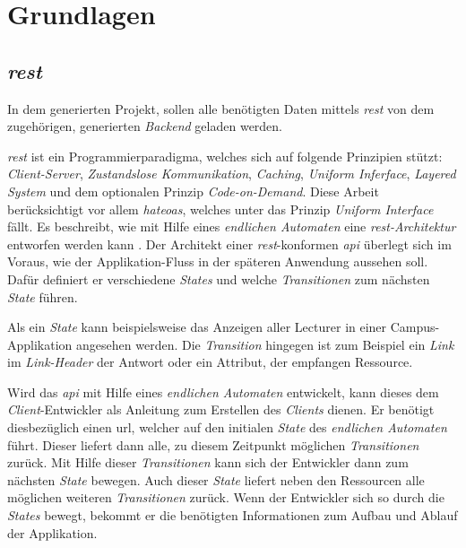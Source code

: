 \chapter{Grundlagen}\label{ch:basics}
\section{\textit{\acf{rest}}}\label{sec:rest}
In dem generierten Projekt, sollen alle benötigten Daten mittels \textit{\ac{rest}} von dem zugehörigen, generierten \textit{Backend} geladen werden. 

 \textit{\ac{rest}} \cite{rest_fielding} ist ein Programmierparadigma, welches sich auf folgende Prinzipien stützt: \textit{Client-Server}, \textit{Zustandslose Kommunikation}, \textit{Caching}, \textit{Uniform Inferface}, \textit{Layered System} und dem optionalen Prinzip \textit{Code-on-Demand}.
Diese Arbeit berücksichtigt vor allem \textit{\acf{hateoas}}, welches unter das Prinzip \textit{Uniform Interface} fällt. Es beschreibt, wie mit Hilfe eines \textit{endlichen Automaten} eine \textit{\ac{rest}-Architektur} entworfen werden kann \cite{hypermedia}.
Der Architekt einer \textit{\ac{rest}}-konformen \textit{\acf{api}} überlegt sich im Voraus, wie der Applikation-Fluss in der späteren Anwendung aussehen soll. Dafür definiert er verschiedene \textit{States} und welche \textit{Transitionen} zum nächsten \textit{State} führen.

Als ein \textit{State} kann beispielsweise das Anzeigen aller Lecturer in einer Campus-Applikation angesehen werden.
Die \textit{Transition} hingegen ist zum Beispiel ein \textit{Link} im \textit{Link-Header} der Antwort oder ein Attribut, der empfangen Ressource. 

Wird das \textit{\ac{api}} mit Hilfe eines \textit{endlichen Automaten} entwickelt, kann dieses dem \textit{Client}-Entwickler als Anleitung zum Erstellen des \textit{Clients} dienen. Er benötigt diesbezüglich einen \acf{url}, welcher auf den initialen \textit{State} des \textit{endlichen Automaten} führt. Dieser liefert dann alle, zu diesem Zeitpunkt möglichen \textit{Transitionen} zurück. Mit Hilfe dieser \textit{Transitionen} kann sich der Entwickler dann zum nächsten \textit{State} bewegen. Auch dieser \textit{State} liefert neben den Ressourcen alle möglichen weiteren \textit{Transitionen} zurück. 
Wenn der Entwickler sich so durch die \textit{States} bewegt, bekommt er die benötigten Informationen zum Aufbau und Ablauf der Applikation.

